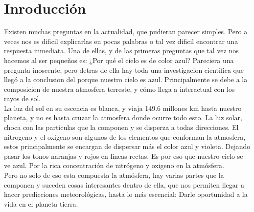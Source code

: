 \documentclass{article}
\begin{document}
\section{Inroducción}
\begin{doublespace}
Existen muchas preguntas en la actualidad, que pudieran parecer simples. Pero a veces nos es dificil explicarlas en pocas palabras o tal vez dificil encontrar una respuesta inmediata. Una de ellas, y de las primeras preguntas que tal vez nos hacemos al ser pequeños es: ¿Por qué el cielo es de color azul? Pareciera una pregunta inoscente, pero detras de ella hay toda una investigacion cientifica que llegó a la conclusion del porque nuestro cielo es azul. 
Principalmente se debe a la composicion de nuestra atmosfera terreste, y cómo llega a interactual con los rayos de sol. \\
La luz del sol en su escencia es blanca, y viaja 149.6 millones km hasta nuestro planeta, y no es hasta cruzar la atmosfera donde ocurre todo esto. La luz solar, choca con las particulas que la componen y se disperza a todas direcciones. El nitrogeno y el oxigeno son algunos de los elementos que conforman la atmosfera, estos principalmente se encargan de dispersar más el color azul y violeta. Dejando pasar los tonos naranjas y rojos en lineas rectas. Es por eso que nuestro cielo se ve azul. Por la rica concentración de nitrógeno y oxigeno en la atmósfera.  \\
Pero no solo de eso esta compuesta la atmósfera, hay varias partes que la componen y suceden cosas interesantes dentro de ella, que nos permiten llegar a hacer predicciones meteorológicas, hasta lo más escencial: Darle oportunidad a la vida en el planeta tierra. 
\end{doublespace}
\pagebreak
\end{document}
